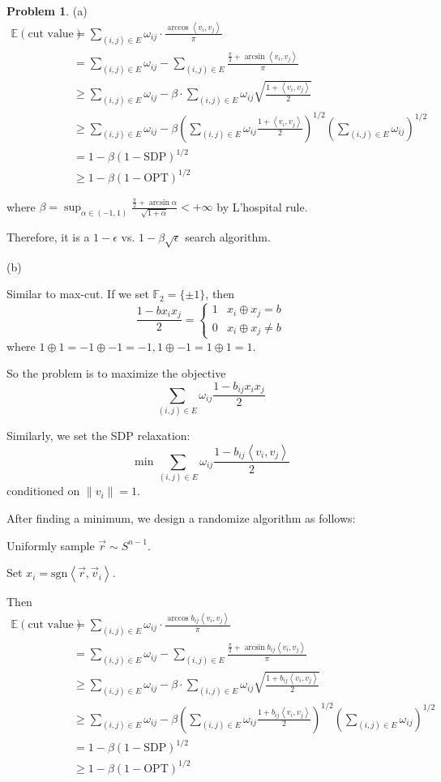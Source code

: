 \documentclass[a4paper]{article}
\theoremstyle{definition}
\newtheorem{problem}{Problem}
\theoremstyle{plain}
\newcommand{\Ebb}{\mathbb E}
\newcommand{\sgn}{\mathrm{sgn}}
\newcommand{\<}{\left<}
\renewcommand{\>}{\right>}
\newcommand{\OPT}{\mathrm{OPT}}
\numberwithin{equation}{problem}
\begin{document}
\begin{problem}
  (a) 
  \[\begin{aligned}
    \Ebb(\text{cut value})&=\sum_{(i,j)\in E}\omega_{ij}\cdot\frac{\arccos \<v_i,v_j\>}{\pi}\\
    &=\sum_{(i,j)\in E}\omega_{ij}-\sum_{(i,j)\in E}\frac{\frac{\pi}{2}+\arcsin \<v_i,v_j\>}{\pi}\\
    & \geq \sum_{(i,j)\in E}\omega_{ij}-\beta\cdot\sum_{(i,j)\in E}\omega_{ij}\sqrt{\frac{1+\<v_i,v_j\>}{2}}\\ 
    & \geq \sum_{(i,j)\in E}\omega_{ij}-\beta\left(\sum_{(i,j)\in E}\omega_{ij}\frac{1+\<v_i,v_j\>}{2}\right)^{1/2}\left(\sum_{(i,j)\in E}\omega_{ij}\right)^{1/2}\\
    &=1-\beta (1-\mathrm{SDP})^{1/2}\\
    & \geq 1-\beta(1-\OPT)^{1/2}
  \end{aligned}\]

  where  $ \beta=\sup_{\alpha\in(-1,1)}\frac{\frac{\pi}{2}+\arcsin \alpha}{\sqrt{1+\alpha}}<+\infty $ by L'hospital rule.

  Therefore, it is a  $ 1-\epsilon $ vs.  $ 1-\beta\sqrt{\epsilon} $ search algorithm.
  
  (b)

  Similar to max-cut. If we set  $ \mathbb{F}_{2}=\{\pm 1\} $,  then 
  \[\frac{1-bx_ix_j}{2}=\begin{cases}
    1&x_i\oplus x_j=b\\
    0&x_i\oplus x_j\neq b
  \end{cases}\]
  where  $ 1\oplus 1=-1\oplus -1=-1,1\oplus -1=1\oplus 1=1  $.
  
  So the problem is to maximize the objective 
  \[\sum_{(i,j)\in E}\omega_{ij}\frac{1-b_{ij}x_ix_j}{2}\]

  Similarly, we set the SDP relaxation:
  \[\min\sum_{(i,j)\in E}\omega_{ij}\frac{1-b_{ij}\<v_i,v_j\>}{2}\]
  conditioned on  $ \|v_i\|=1 $.
  
  After finding a minimum, we design a randomize algorithm as follows:

  Uniformly sample  $ \vec{r}\sim S^{n-1} $.
  
  Set  $ x_i=\sgn\<\vec{r},\vec{v}_i\> $.
  
  Then 
  \[\begin{aligned}
    \Ebb(\text{cut value})&=\sum_{(i,j)\in E}\omega_{ij}\cdot\frac{\arccos b_{ij}\<v_i,v_j\>}{\pi}\\
    &=\sum_{(i,j)\in E}\omega_{ij}-\sum_{(i,j)\in E}\frac{\frac{\pi}{2}+\arcsin b_{ij}\<v_i,v_j\>}{\pi}\\
    & \geq \sum_{(i,j)\in E}\omega_{ij}-\beta\cdot\sum_{(i,j)\in E}\omega_{ij}\sqrt{\frac{1+b_{ij}\<v_i,v_j\>}{2}}\\ 
    & \geq \sum_{(i,j)\in E}\omega_{ij}-\beta\left(\sum_{(i,j)\in E}\omega_{ij}\frac{1+b_{ij}\<v_i,v_j\>}{2}\right)^{1/2}\left(\sum_{(i,j)\in E}\omega_{ij}\right)^{1/2}\\
    &=1-\beta (1-\mathrm{SDP})^{1/2}\\
    & \geq 1-\beta(1-\OPT)^{1/2}
  \end{aligned}\]


\end{problem}
\end{document}
